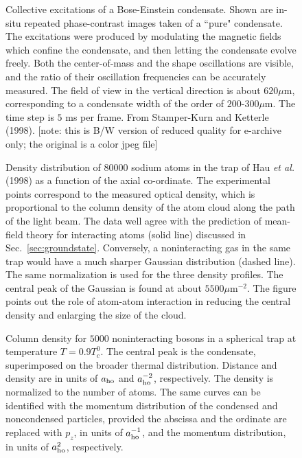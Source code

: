 \bigskip

\begin{figure}[t]
\epsfysize=6cm
\hspace{3cm}
\caption{Collective excitations of a Bose-Einstein condensate.  Shown 
are in-situ repeated phase-contrast images taken of a ``pure" condensate.  
The excitations were produced by modulating the magnetic fields which 
confine the condensate, and then letting the condensate evolve freely.  
Both the center-of-mass and the shape oscillations are visible, and the 
ratio of their oscillation frequencies can be accurately measured.
The field of view in the vertical direction is about $620 \mu$m, 
corresponding to a condensate width of the order of $200$-$300 \mu$m.
The time step is $5$ ms per frame.  From Stamper-Kurn and Ketterle (1998). 
[note: this is B/W version of reduced quality
for e-archive only; the original is a color jpeg file] }
\label{fig:insitu}
\end{figure}

\bigskip

\begin{figure}[t]
\epsfysize=8cm
\hspace{3cm}
\caption{Density distribution of $80000$ sodium atoms in the trap of Hau 
{\it et al.} (1998) as a function of the axial co-ordinate. The 
experimental points correspond to the measured optical density,
which is proportional to the column density of the atom cloud along 
the path of the light beam. The data well agree with the prediction 
of mean-field theory for interacting atoms (solid line) 
discussed in  Sec.~\protect\ref{sec:groundstate}. Conversely, 
a noninteracting gas in the same trap would have a much sharper Gaussian 
distribution (dashed line). The same normalization is used for the 
three density profiles. The central peak of the Gaussian is 
found at about $5500 \mu$m$^{-2}$. The figure points out the role 
of atom-atom interaction in reducing the central density and enlarging 
the size of the cloud. }
\label{fig:hau}
\end{figure}

\bigskip

\begin{figure}[t]
\epsfysize=8cm
\hspace{3cm}
\caption{Column density for $5000$ noninteracting bosons in 
a spherical trap at temperature $T= 0.9 T_c^0$. The central peak
is the condensate, superimposed on the broader thermal distribution. 
Distance and density are in units of $a_{\rm ho}$ and $a_{\rm ho}^{-2}$,
respectively. The density  is normalized to the number of atoms. The 
same curves can be identified with the momentum distribution of the 
condensed and noncondensed particles, provided the abscissa and the 
ordinate are replaced with $p_z$, in units of $a_{\rm ho}^{-1}$, and 
the momentum distribution, in units of $a_{\rm ho}^2$, respectively. } 
\label{fig:s-peak}
\end{figure}

